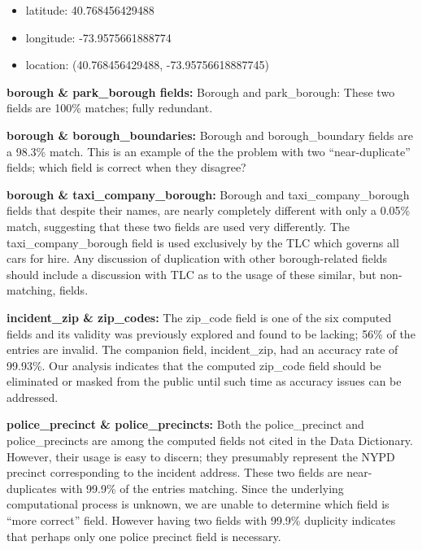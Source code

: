 \documentclass[linenumber]{jdsart}
\begin{document}
\begin{itemize}
	\item  latitude: 40.768456429488
	
	\item  longitude: -73.9575661888774
	
	\item  location: (40.768456429488, -73.95756618887745)
\end{itemize}


\label{sec:parkborough}
\textbf{borough \&  park\_borough fields:} Borough and 
park\_borough: These two fields are 100\% matches; fully redundant.


\label{sec:boroughboundaries}
\textbf{borough \& borough\_boundaries:} Borough and 
borough\_boundary fields are a 98.3\% match. This 
is an example of the the problem with two ``near-duplicate'' 
fields; which field is correct when they disagree?


\label{sec:taxicompanyborough}
\textbf{borough \& taxi\_company\_borough:} Borough and 
taxi\_company\_borough fields that despite their names, are 
nearly completely different with only a 0.05\% match, suggesting 
that these two fields are used very differently. The taxi\_company\_borough
 field is used exclusively by the TLC which governs all cars for hire. Any
 discussion of duplication with other borough-related fields 
 should include a discussion with TLC as to the usage of these similar,
 but non-matching, fields.
 

\label{sec:zipcodes}
\textbf{incident\_zip \& zip\_codes:} The zip\_code field is one 
of the six computed fields and its validity 
 was previously explored and found to be 
 lacking; 56\% of the entries are invalid. The companion 
 field, incident\_zip, had an accuracy rate of 99.93\%. Our analysis
 indicates that the computed zip\_code field should be eliminated
 or masked from the public until such time as accuracy 
 issues can be addressed. 


\label{sec:police} 
\textbf{police\_precinct \& police\_precincts:} Both the 
police\_precinct and police\_precincts are among the computed 
fields not cited in the Data Dictionary. However, their usage is easy to 
discern; they presumably represent the NYPD precinct 
corresponding to the incident address. These two 
fields are near-duplicates with 99.9\% of the entries 
matching. Since the underlying computational process 
is unknown, we are unable to determine which 
field is ``more correct'' field. However having two fields with 99.9\% 
duplicity indicates that perhaps only one police 
precinct field is necessary.
\end{document}
